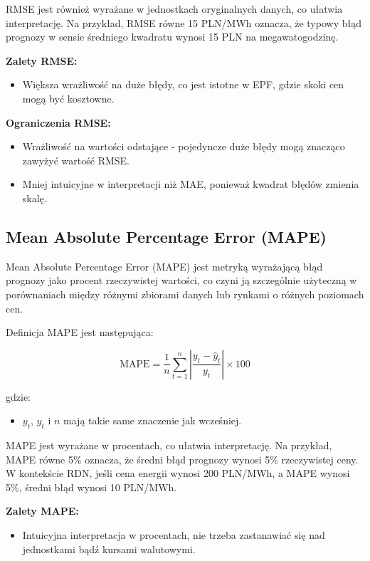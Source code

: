 RMSE jest również wyrażane w jednostkach oryginalnych danych, co ułatwia interpretację. Na przykład, RMSE równe 15 PLN/MWh oznacza, że typowy błąd prognozy w sensie średniego kwadratu wynosi 15 PLN na megawatogodzinę.

\textbf{Zalety RMSE:}
\begin{itemize}
    \item Większa wrażliwość na duże błędy, co jest istotne w EPF, gdzie skoki cen mogą być kosztowne.
\end{itemize}

\textbf{Ograniczenia RMSE:}
\begin{itemize}
    \item Wrażliwość na wartości odstające - pojedyncze duże błędy mogą znacząco zawyżyć wartość RMSE.
    \item Mniej intuicyjne w interpretacji niż MAE, ponieważ kwadrat błędów zmienia skalę.
\end{itemize}

\subsection{Mean Absolute Percentage Error (MAPE)}
\label{subsec:mape}

Mean Absolute Percentage Error (MAPE) jest metryką wyrażającą błąd prognozy jako procent rzeczywistej wartości, co czyni ją szczególnie użyteczną w porównaniach między różnymi zbiorami danych lub rynkami o różnych poziomach cen.

Definicja MAPE jest następująca:

\[
\text{MAPE} = \frac{1}{n} \sum_{t=1}^{n} \left| \frac{y_t - \hat{y}_t}{y_t} \right| \times 100
\]

gdzie:
\begin{itemize}
    \item \( y_t \), \( \hat{y}_t \) i \( n \) mają takie same znaczenie jak wcześniej.
\end{itemize}

MAPE jest wyrażane w procentach, co ułatwia interpretację. Na przykład, MAPE równe 5\% oznacza, że średni błąd prognozy wynosi 5\% rzeczywistej ceny. W kontekście RDN, jeśli cena energii wynosi 200 PLN/MWh, a MAPE wynosi 5\%, średni błąd wynosi 10 PLN/MWh.

\textbf{Zalety MAPE:}
\begin{itemize}
    \item Intuicyjna interpretacja w procentach, nie trzeba zastanawiać się nad jednostkami bądź kursami walutowymi.
\end{itemize}

